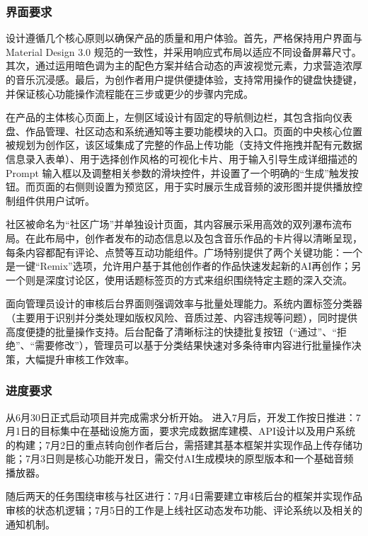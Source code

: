 \documentclass{base}
\begin{document}
\subsubsection{界面要求}

设计遵循几个核心原则以确保产品的质量和用户体验。首先，严格保持用户界面与 Material Design 3.0 规范的一致性，并采用响应式布局以适应不同设备屏幕尺寸。其次，通过运用暗色调为主的配色方案并结合动态的声波视觉元素，力求营造浓厚的音乐沉浸感。最后，为创作者用户提供便捷体验，支持常用操作的键盘快捷键，并保证核心功能操作流程能在三步或更少的步骤内完成。

在产品的主体核心页面上，左侧区域设计有固定的导航侧边栏，其包含指向仪表盘、作品管理、社区动态和系统通知等主要功能模块的入口。页面的中央核心位置被规划为创作区，该区域集成了完整的作品上传功能（支持文件拖拽并配有元数据信息录入表单）、用于选择创作风格的可视化卡片、用于输入引导生成详细描述的 Prompt 输入框以及调整相关参数的滑块控件，并设置了一个明确的“生成”触发按钮。而页面的右侧则设置为预览区，用于实时展示生成音频的波形图并提供播放控制组件供用户试听。

社区被命名为“社区广场”并单独设计页面，其内容展示采用高效的双列瀑布流布局。在此布局中，创作者发布的动态信息以及包含音乐作品的卡片得以清晰呈现，每条内容都配有评论、点赞等互动功能组件。广场特别提供了两个关键功能：一个是一键“Remix”选项，允许用户基于其他创作者的作品快速发起新的AI再创作；另一个则是深度讨论区，使用话题标签页的方式来组织围绕特定主题的深入交流。

面向管理员设计的审核后台界面则强调效率与批量处理能力。系统内置标签分类器（主要用于识别并分类处理如版权风险、音质过差、内容违规等问题），同时提供高度便捷的批量操作支持。后台配备了清晰标注的快捷批复按钮（“通过”、“拒绝”、“需要修改”），管理员可以基于分类结果快速对多条待审内容进行批量操作决策，大幅提升审核工作效率。

\subsubsection{进度要求}

从6月30日正式启动项目并完成需求分析开始。
进入7月后，开发工作按日推进：7月1日的目标集中在基础设施方面，要求完成数据库建模、API设计以及用户系统的构建；7月2日的重点转向创作者后台，需搭建其基本框架并实现作品上传存储功能；7月3日则是核心功能开发日，需交付AI生成模块的原型版本和一个基础音频播放器。

随后两天的任务围绕审核与社区进行：7月4日需要建立审核后台的框架并实现作品审核的状态机逻辑；7月5日的工作是上线社区动态发布功能、评论系统以及相关的通知机制。
\end{document}
